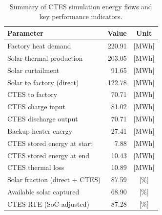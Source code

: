 \renewcommand{\arraystretch}{1.2}
\begin{table}[h]
\centering
\begin{tabular}{l|r c}
\hline
Parameter & Value & Unit \\
\hline
Factory heat demand & 220.91 & [MWh] \\
Solar thermal production & 203.05 & [MWh] \\
Solar curtailment & 91.65 & [MWh] \\
Solar to factory (direct) & 122.78 & [MWh] \\
CTES to factory & 70.71 & [MWh] \\
CTES charge input & 81.02 & [MWh] \\
CTES discharge output & 70.71 & [MWh] \\
Backup heater energy & 27.41 & [MWh] \\
CTES stored energy at start & 7.88 & [MWh] \\
CTES stored energy at end & 10.43 & [MWh] \\
CTES thermal loss & 10.89 & [MWh] \\
\hline
Solar fraction (direct + CTES) & 87.59 & [\%] \\
Available solar captured & 68.90 & [\%] \\
CTES RTE (SoC-adjusted) & 87.28 & [\%] \\
\hline
\end{tabular}
\caption{Summary of CTES simulation energy flows and key performance indicators.}
\label{tab:ctes-simulation-summary}
\end{table}
